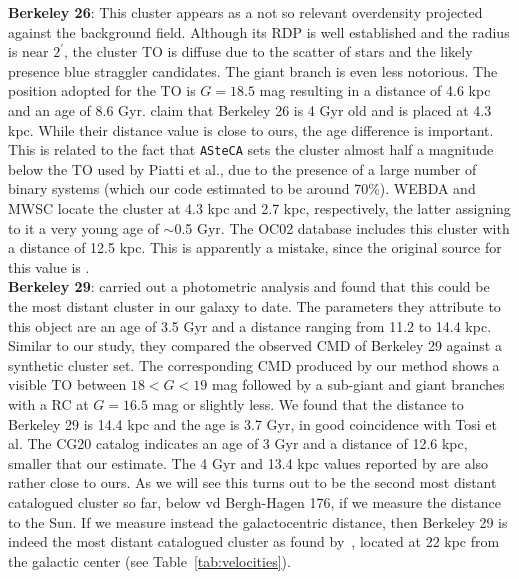 \documentclass{aa}
\begin{document}
\begin{appendix}
  \noindent \textbf{Berkeley 26}: This cluster appears as a not so relevant overdensity
  projected against the background field. Although its RDP is well established
  and the radius is near $2^{\prime}$, the cluster TO is diffuse due to the
  scatter of stars and the likely presence blue straggler candidates. The
  giant branch is even less notorious.
  The position adopted for the TO is $G=18.5$ mag resulting in a distance of 4.6
  kpc and an age of 8.6 Gyr. \cite{Piatti_2010} claim that Berkeley 26 is 4 Gyr
  old and is placed at 4.3 kpc. While their distance value is close to ours, the
  age difference is important. This is related to the fact that \texttt{ASteCA}
  sets the cluster almost half a magnitude below the TO used by Piatti et al.,
  due to the presence of a large number of binary systems (which our code
  estimated to be around 70\%).
  WEBDA and MWSC locate the cluster at 4.3 kpc and 2.7 kpc, respectively, the
  latter assigning to it a very young age of $\sim$0.5 Gyr. The OC02 database
  includes this cluster with a distance of 12.5 kpc. This is apparently
  a mistake, since the original source for this value is \cite{Piatti_2010}.\\

  \noindent \textbf{Berkeley 29}: \cite{Tosi_2004} carried out a photometric analysis
  and found that this could be the most distant cluster in our galaxy to date.
  The parameters they attribute to this object are an age of 3.5 Gyr and a
  distance ranging from 11.2 to 14.4 kpc.
  Similar to our study, they compared the observed CMD of Berkeley 29 against a
  synthetic cluster set. The corresponding CMD produced by our method
  shows a visible TO between $18<G<19$ mag followed by a sub-giant and giant
  branches with a RC at $G=16.5$ mag or slightly less. We found that the
  distance to Berkeley 29 is 14.4 kpc and the age is 3.7 Gyr, in good
  coincidence with Tosi et al. The CG20 catalog indicates an age of 3 Gyr and a
  distance of 12.6 kpc, smaller that our estimate. The 4 Gyr and 13.4
  kpc values reported by \cite{Frinchaboy_2006} are also rather close to ours.
  As we will see this turns out to be the second most
  distant catalogued cluster so far, below vd Bergh-Hagen 176, if we measure
  the distance to the Sun. If we measure instead the galactocentric distance,
  then Berkeley 29 is indeed the most distant catalogued cluster as found
  by~\cite{Tosi_2004}, located at 22 kpc from the galactic center (see
  Table~\ref{tab:velocities}).\\


\end{appendix}
\end{document}
